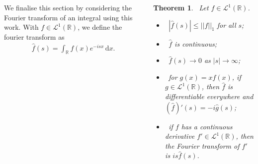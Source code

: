 \documentclass{tikzposter} %
\newtheorem{theorem}{Theorem}
\begin{document}
\begin{columns}
{        We finalise this section by considering the Fourier transform of an integral using this work. With $f \in \mathcal{L}^{1}(\mathbb{R})$, we define the fourier transform as
        \begin{align*}
          \widehat{f}(s) = \int_{\mathbb{R}} f(x)e^{-isx} \, \mathrm{d}x.
        \end{align*}

        \begin{theorem}
        \ Let $f \in \mathcal{L}^{1}(\mathbb{R})$.
        \begin{itemize}
          \item \ $|\widehat{f}(s)| \le ||f||_{1}$ for all $s$;
          \item \ $\widehat{f}$ is continuous;
          \item \ $\widehat{f}(s) \to 0$ as $|s| \to \infty$;
          \item \ for $g(x) = xf(x)$, if $g \in \mathcal{L}^{1}(\mathbb{R})$, then $\widehat{f}$ is differentiable everywhere and $(\widehat{f})'(s) = -i\widehat{g}(s)$;
          \item \ if $f$ has a continuous derivative $f' \in \mathcal{L}^{1}(\mathbb{R})$, then the Fourier transform of $f'$ is $is\widehat{f}(s)$.
        \end{itemize}
        \end{theorem}
      }

\end{columns}
\end{document}
